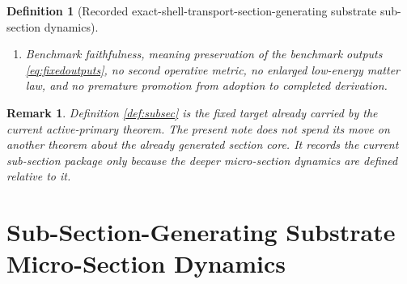\documentclass[11pt]{article}
\newcommand{\PreCoreTrShell}[1]{\mathcal Z_{#1}^{\mathrm{precore,tr}}}
\newcommand{\SubSectionProj}[1]{\Pi_{#1}^{\mathrm{subsec}}}
\newcommand{\SubSectionFiber}[2]{\mathcal F_{#1}^{\mathrm{subsec}}(#2)}
\newcommand{\SubSectionFunctional}[1]{\mathscr E_{#1}^{\mathrm{subsec}}}
\newcommand{\SubSectionShell}[1]{\mathcal Z_{#1}^{\mathrm{subsec}}}
\newtheorem{definition}{Definition}
\newtheorem{remark}{Remark}
\begin{document}
\begin{definition}[Recorded exact-shell-transport-section-generating substrate sub-section dynamics]
\begin{enumerate}
\[    \SubSectionProj{\sigma}(y)\in\PreCoreTrShell{\sigma},
    \;
    \SubSectionFunctional{\sigma}(y)
    =
    \min_{z\in\SubSectionFiber{\sigma}{\SubSectionProj{\sigma}(y)}}
    \SubSectionFunctional{\sigma}(z)
    \right\},
    \]
    and
    \[
    \SubSectionProj{\sigma}\big|_{\SubSectionShell{\sigma}}
    :
    \SubSectionShell{\sigma}
    \xrightarrow{\cong}
    \PreCoreTrShell{\sigma}
    \]
    is a diffeomorphism.
    \item Benchmark faithfulness, meaning preservation of the benchmark outputs \eqref{eq:fixedoutputs}, no second operative metric, no enlarged low-energy matter law, and no premature promotion from adoption to completed derivation.
\end{enumerate}
\end{definition}

\begin{remark}
Definition \ref{def:subsec} is the fixed target already carried by the current active-primary theorem. The present note does not spend its move on another theorem about the already generated section core. It records the current sub-section package only because the deeper micro-section dynamics are defined relative to it.
\end{remark}

\section{Sub-Section-Generating Substrate Micro-Section Dynamics}
\end{document}

